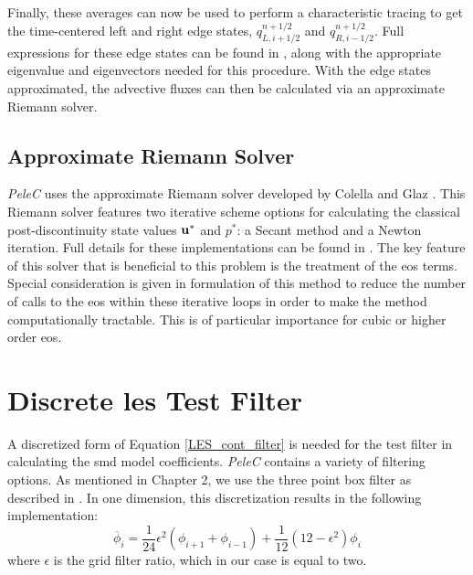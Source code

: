 Finally, these averages can now be used to perform a characteristic tracing to get the time-centered left and right edge states, $q_{L, i+1/2}^{n+1/2}$ and $q_{R, i-1/2}^{n+1/2}$. Full expressions for these edge states can be found in \cite{}, along with the appropriate eigenvalue and eigenvectors needed for this procedure. With the edge states approximated, the advective fluxes can then be calculated via an approximate Riemann solver.


\subsection{Approximate Riemann Solver}
\textit{PeleC} uses the approximate Riemann solver developed by Colella and Glaz \cite{COLELLA1985264}. This Riemann solver features two iterative scheme options for calculating the classical post-discontinuity state values $\vb{u}^*$ and $p^*$: a Secant method and a Newton iteration. Full details for these implementations can be found in \cite{COLELLA1985264}. The key feature of this solver that is beneficial to this problem is the treatment of the \gls{eos} terms. Special consideration is given in formulation of this method to reduce the number of calls to the \gls{eos} within these iterative loops in order to make the method computationally tractable. This is of particular importance for cubic or higher order \gls{eos}. 

\section{Discrete \gls{les} Test Filter}
A discretized form of Equation \ref{LES_cont_filter} is needed for the test filter in calculating the \gls{smd} model coefficients. \textit{PeleC} contains a variety of filtering options. As mentioned in Chapter 2, we use the three point box filter as described in \cite{filter}. In one dimension, this discretization results in the following implementation:
\begin{equation}
\overline{\phi}_i = \dfrac{1}{24}\epsilon^2\left(\phi_{i+1} + \phi_{i-1} \right) + \dfrac{1}{12}\left( 12 - \epsilon^2\right)\phi_i
\end{equation}
where $\epsilon$ is the grid filter ratio, which in our case is equal to two. 


